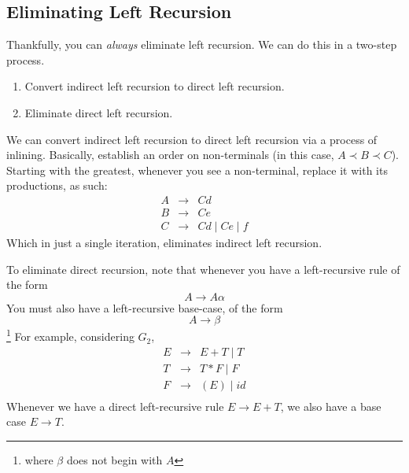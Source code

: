 \subsection{Eliminating Left Recursion}
Thankfully, you can \textit{always} eliminate left recursion. We can do this in a two-step process.

\begin{enumerate}
    \item Convert indirect left recursion to direct left recursion.
    \item Eliminate direct left recursion.
\end{enumerate}

We can convert indirect left recursion to direct left recursion via a process of inlining. Basically, establish an order on non-terminals (in this case, $A \prec B \prec C$). Starting with the greatest, whenever you see a non-terminal, replace it with its productions, as such:
\[\begin{array}{lcl}
     A & \rightarrow & Cd  \\
     B & \rightarrow & Ce \\
     C & \rightarrow & Cd \mid Ce \mid f
\end{array}\]
Which in just a single iteration, eliminates indirect left recursion.

To eliminate direct recursion, note that whenever you have a left-recursive rule of the form
\[ A \rightarrow A\alpha \]
You must also have a left-recursive base-case, of the form
\[A \rightarrow \beta \]\footnote{where $\beta$ does not begin with $A$}
For example, considering $G_2$,
\[
\begin{array}{rcl}
E &\to& E + T \mid T\\
T &\to& T * F \mid F\\
F &\to& (E) \mid id\\
\end{array}
\]
Whenever we have a direct left-recursive rule $E \to E + T$, we also have a base case $E \to T$.

